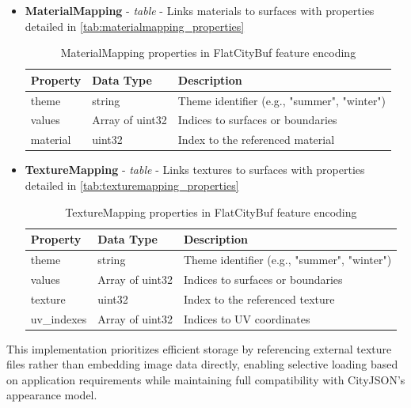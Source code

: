 \begin{itemize}
  \item \textbf{MaterialMapping} - \textit{table} - Links materials to surfaces with properties detailed in \autoref{tab:materialmapping_properties}

    \begin{table}[h]
      \centering
      \caption{MaterialMapping properties in FlatCityBuf feature encoding}
      \label{tab:materialmapping_properties}
      \small
      \begin{tabularx}{\textwidth}{@{}llX@{}}
        \toprule
        \textbf{Property} & \textbf{Data Type} & \textbf{Description} \\
        \midrule
        theme & string & Theme identifier (e.g., "summer", "winter") \\
        values & Array of uint32 & Indices to surfaces or boundaries \\
        material & uint32 & Index to the referenced material \\
        \bottomrule
      \end{tabularx}
    \end{table}

  \item \textbf{TextureMapping} - \textit{table} - Links textures to surfaces with properties detailed in \autoref{tab:texturemapping_properties}

    \begin{table}[h]
      \centering
      \caption{TextureMapping properties in FlatCityBuf feature encoding}
      \label{tab:texturemapping_properties}
      \small
      \begin{tabularx}{\textwidth}{@{}llX@{}}
        \toprule
        \textbf{Property} & \textbf{Data Type} & \textbf{Description} \\
        \midrule
        theme & string & Theme identifier (e.g., "summer", "winter") \\
        values & Array of uint32 & Indices to surfaces or boundaries \\
        texture & uint32 & Index to the referenced texture \\
        uv\_indexes & Array of uint32 & Indices to UV coordinates \\
        \bottomrule
      \end{tabularx}
    \end{table}
\end{itemize}

This implementation prioritizes efficient storage by referencing external texture files rather than embedding image data directly, enabling selective loading based on application requirements while maintaining full compatibility with CityJSON's appearance model.

